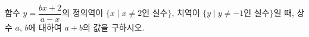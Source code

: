\hspace*{2mm}\begin{minipage}[t]{\dimexpr\linewidth-2mm\relax}\vspace{0pt}
함수 $y=\dfrac{bx+2}{a-x}$의 정의역이 $\{x \mid x\ne 2$인 실수$\}$, 치역이 $\{y \mid y\ne -1$인 실수$\}$일 때, 상수 $a$, $b$에 대하여 $a+b$의 값을 구하시오.\end{minipage}
